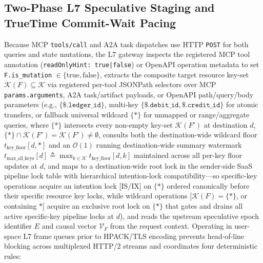 \documentclass[conference,10pt]{IEEEtran}
\begin{document}
\subsection{Two-Phase L7 Speculative Staging and TrueTime Commit-Wait Pacing}
Because MCP \texttt{tools/call} and A2A task dispatches use HTTP \texttt{POST} for both queries and state mutations, the L7 gateway inspects the registered MCP tool annotation (\texttt{readOnlyHint: true|false}) or OpenAPI operation metadata to set \texttt{F.is\_mutation} $\in \{\text{true}, \text{false}\}$, extracts the composite target resource key-set $\mathcal{K}(F) \subseteq \mathcal{K}$ via registered per-tool JSONPath selectors over MCP \texttt{params.arguments}, A2A task/artifact payloads, or OpenAPI path/query/body parameters (e.g., $\{\texttt{\$.ledger\_id}\}$, multi-key $\{\texttt{\$.debit\_id}, \texttt{\$.credit\_id}\}$ for atomic transfers, or fallback universal wildcard $\{\texttt{*}\}$ for unmapped or range/aggregate queries, where $\{\texttt{*}\}$ intersects every non-empty key-set $\mathcal{K}(F')$ at destination $d$, $\{\texttt{*}\} \cap \mathcal{K}(F') = \mathcal{K}(F') \ne \emptyset$, consults both the destination-wide wildcard floor $t_{\text{key\_floor}}[d, \texttt{*}]$ and an $\mathcal{O}(1)$ running destination-wide summary watermark $t_{\text{max\_all\_keys}}[d] \triangleq \max_{k \in \mathcal{K}} t_{\text{key\_floor}}[d, k]$ maintained across all per-key floor updates at $d$, and maps to a destination-wide root lock in the sender-side SaaS pipeline lock table with hierarchical intention-lock compatibility---so specific-key operations acquire an intention lock [$\text{IS}/\text{IX}$] on $\{\texttt{*}\}$ ordered canonically before their specific resource key locks, while wildcard operations [$\mathcal{K}(F) = \{\texttt{*}\}$, or containing $\texttt{*}$] acquire an exclusive root lock on $\{\texttt{*}\}$ that gates and drains all active specific-key pipeline locks at $d$), and reads the upstream speculative epoch identifier $E$ and causal vector $\mathcal{V}_F$ from the request context. Operating in user-space L7 frame queues prior to HPACK/TLS encoding prevents head-of-line blocking across multiplexed HTTP/2 streams and coordinates four deterministic rules:
\end{document}
